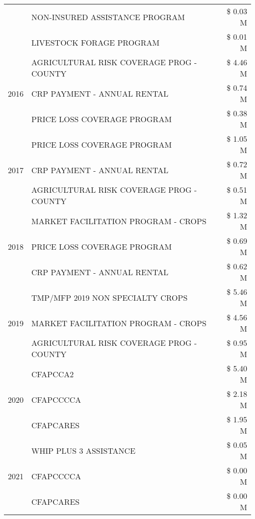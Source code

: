 \begin{tabular}{llr}
 & NON-INSURED ASSISTANCE PROGRAM & \$ 0.03 M \\
 & LIVESTOCK FORAGE PROGRAM & \$ 0.01 M \\
\cline{1-3}
\multirow[t]{3}{*}{2016} & AGRICULTURAL RISK COVERAGE PROG - COUNTY & \$ 4.46 M \\
 & CRP PAYMENT - ANNUAL RENTAL & \$ 0.74 M \\
 & PRICE LOSS COVERAGE PROGRAM & \$ 0.38 M \\
\cline{1-3}
\multirow[t]{3}{*}{2017} & PRICE LOSS COVERAGE PROGRAM & \$ 1.05 M \\
 & CRP PAYMENT - ANNUAL RENTAL & \$ 0.72 M \\
 & AGRICULTURAL RISK COVERAGE PROG - COUNTY & \$ 0.51 M \\
\cline{1-3}
\multirow[t]{3}{*}{2018} & MARKET FACILITATION PROGRAM - CROPS & \$ 1.32 M \\
 & PRICE LOSS COVERAGE PROGRAM & \$ 0.69 M \\
 & CRP PAYMENT - ANNUAL RENTAL & \$ 0.62 M \\
\cline{1-3}
\multirow[t]{3}{*}{2019} & TMP/MFP 2019 NON SPECIALTY CROPS & \$ 5.46 M \\
 & MARKET FACILITATION PROGRAM - CROPS & \$ 4.56 M \\
 & AGRICULTURAL RISK COVERAGE PROG - COUNTY & \$ 0.95 M \\
\cline{1-3}
\multirow[t]{3}{*}{2020} & CFAPCCA2 & \$ 5.40 M \\
 & CFAPCCCCA & \$ 2.18 M \\
 & CFAPCARES & \$ 1.95 M \\
\cline{1-3}
\multirow[t]{3}{*}{2021} & WHIP PLUS 3 ASSISTANCE & \$ 0.05 M \\
 & CFAPCCCCA & \$ 0.00 M \\
 & CFAPCARES & \$ 0.00 M \\
\cline{1-3}
\bottomrule
\end{tabular}
